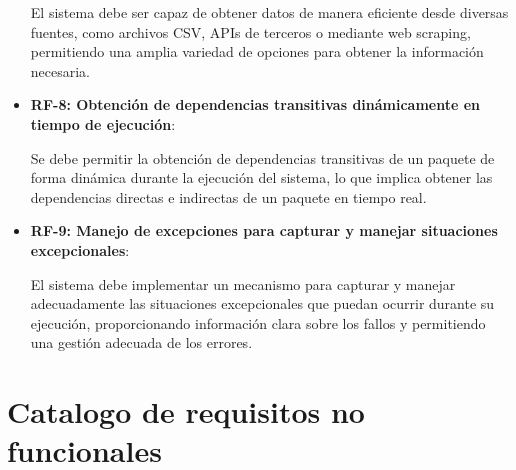 \begin{itemize}
	      El sistema debe ser capaz de obtener datos de manera eficiente desde diversas fuentes, como archivos CSV, APIs de terceros o mediante web scraping, permitiendo una amplia variedad de opciones para obtener la información necesaria.

	\item \textbf{RF-8: Obtención de dependencias transitivas dinámicamente en tiempo de ejecución}:

	      Se debe permitir la obtención de dependencias transitivas de un paquete de forma dinámica durante la ejecución del sistema, lo que implica obtener las dependencias directas e indirectas de un paquete en tiempo real.

	\item \textbf{RF-9: Manejo de excepciones para capturar y manejar situaciones excepcionales}:

	      El sistema debe implementar un mecanismo para capturar y manejar adecuadamente las situaciones excepcionales que puedan ocurrir durante su ejecución, proporcionando información clara sobre los fallos y permitiendo una gestión adecuada de los errores.
\end{itemize}

\section{Catalogo de requisitos no funcionales}

